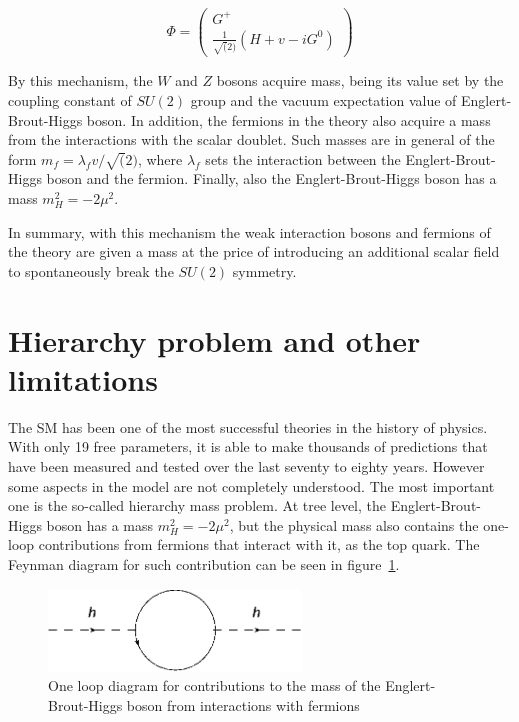 \begin{equation}
  \label{eq:TransHiggsDoublet}
  \Phi=\left(
    \begin{array}{c}
      G^{+} \\
      \frac{1}{\sqrt(2)}(H+v-iG^{0})
    \end{array}
  \right)
\end{equation}

By this mechanism, the $W$ and $Z$ bosons acquire mass, being its value set by the coupling constant of $SU(2)$ group and the vacuum expectation value of Englert-Brout-Higgs boson. In addition, the fermions in the theory also acquire a mass from the interactions with the scalar doublet. Such masses are in general of the form $m_{f}=\lambda_{f}v/\sqrt(2)$, where $\lambda_{f}$ sets the interaction between the Englert-Brout-Higgs boson and the fermion. Finally, also the Englert-Brout-Higgs boson has a mass $m_{H}^{2}=-2\mu^{2}$.

In summary, with this mechanism the weak interaction bosons and fermions of the theory are given a mass at the price of introducing an additional scalar field to spontaneously break the $SU(2)$ symmetry.

\section{Hierarchy problem and other limitations}
\label{sec:hier}

The SM has been one of the most successful theories in the history of physics. With only 19 free parameters, it is able to make thousands of predictions that have been measured and tested over the last seventy to eighty years. However some aspects in the model are not completely understood. The most important one is the so-called hierarchy mass problem. At tree level, the Englert-Brout-Higgs boson has a mass $m_{H}^{2}=-2\mu^{2}$, but the physical mass also contains the one-loop contributions from fermions that interact with it, as the top quark. The Feynman diagram for such contribution can be seen in figure~\ref{fig:oneloophiggs}.

\begin{figure}[!Hhtbp]
  \begin{center}
    \includegraphics[width=0.6\textwidth]{figs/HierarchyLoop.png}
    \caption{One loop diagram for contributions to the mass of the Englert-Brout-Higgs boson from interactions with fermions}
    \label{fig:oneloophiggs}
  \end{center}
\end{figure}

